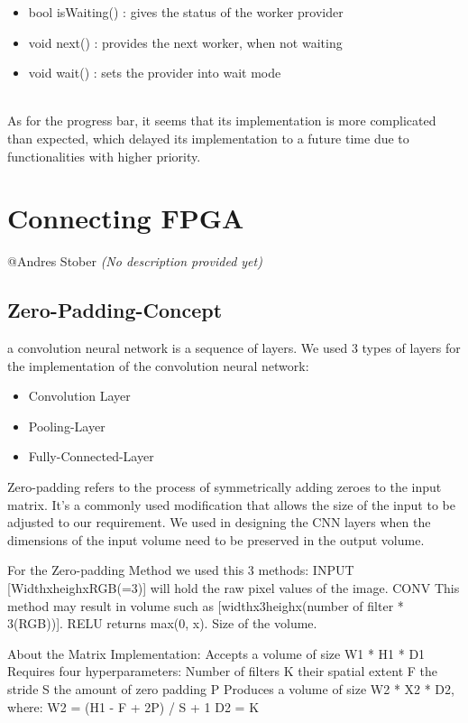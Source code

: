\documentclass[parskip=full]{scrartcl}
\begin{document}
	\begin {itemize}
		\item bool isWaiting() : gives the status of the worker provider
		\item void next() : provides the next worker, when not waiting
		\item void wait() : sets the provider into wait mode
	\end{itemize}
\\As for the progress bar, it seems that its implementation is more complicated than expected, which delayed its implementation to a future time due to functionalities with higher priority.
	
	
\pagebreak

\section{Connecting FPGA} \label{Connecting FPGA}
	@Andres Stober \textit{(No description provided yet)}
\subsection{Zero-Padding-Concept}

a convolution neural network is a sequence of layers. We used 3 types of layers for the implementation of the convolution neural network:

\begin {itemize}
	\item Convolution Layer
	\item Pooling-Layer
	\item Fully-Connected-Layer
\end{itemize}

Zero-padding refers to the process of symmetrically adding zeroes to the input matrix. 
It's a commonly used modification that allows the size of the input to be adjusted to our requirement. We used in designing the CNN layers when the dimensions of the input volume need to be preserved in the output volume.

For the Zero-padding Method we used this 3 methods:
INPUT [WidthxheighxRGB(=3)] will hold the raw pixel values of the image.
CONV This method may result in volume such as [widthx3heighx(number of filter * 3(RGB))].
RELU returns max(0, x). Size of the volume.
    
About the Matrix Implementation:
Accepts a volume of size W1 * H1 * D1
Requires four hyperparameters: 
Number of filters K
their spatial extent F
the stride S
the amount of zero padding P
Produces a volume of size W2 * X2 * D2, where:
W2 = (H1 - F + 2P) / S + 1
D2 = K
\end{document}
